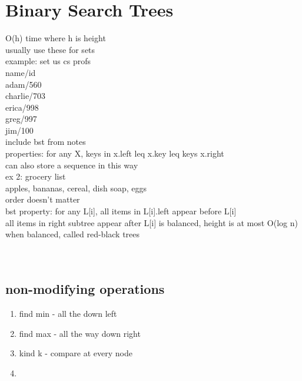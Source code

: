 \documentclass{article}
\begin{document}
\section{Binary Search Trees}
O(h) time where h is height\\
usually use these for sets\\
example: set us cs profs\\
name/id\\
adam/560\\
charlie/703\\
erica/998\\
greg/997\\
jim/100\\
include bst from notes\\
properties: for any X, keys in x.left leq x.key leq keys x.right\\
can also store a sequence in this way\\
ex 2: grocery list\\
apples, bananas, cereal, dish soap, eggs\\
order doesn't matter\\
bst property: for any L[i], all items in L[i].left appear before L[i]\\
all items in right subtree appear after L[i]
is balanced, height is at most O(log n)\\
when balanced, called red-black trees\\
\\
\\
\subsection{non-modifying operations}
\begin{enumerate}
    \item find min - all the down left
    \item find max - all the way down right 
    \item kind k - compare at every node
    \item 
\end{enumerate}
\end{document}
